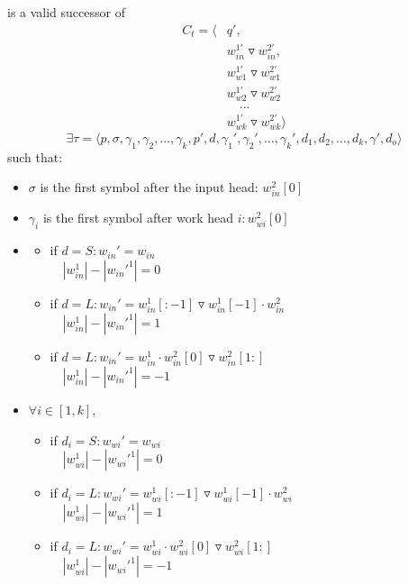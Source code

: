 \documentclass{article}
\newtheorem{definition}[theorem]{Definition}
\let\olddefinition\definition
\let\endolddefinition\enddefinition
\renewenvironment{definition}
  {\begin{tcolorbox}[
      colback=red!10,
      colframe=red!50!black,
      boxrule=0.6pt,
      arc=2pt,
      left=6pt,right=6pt,top=4pt,bottom=4pt,
      breakable
    ]\olddefinition}
  {\endolddefinition\end{tcolorbox}}
\begin{document}
\begin{definition}[Configuration]
    is a valid successor of 
    \begin{align*}
        C_{t} = \langle &q',\\
        & w_{in}^{1'}\triangledown w_{in}^{2'}, \\
        & w_{w1}^{1'}\triangledown w_{w1}^{2'} \\
        & w_{w2}^{1'}\triangledown w_{w2}^{2'} \\
        &\quad ...\\
        & w_{wk}^{1'}\triangledown w_{wk}^{2'} \rangle
    \end{align*}
    \[\exists \tau = \langle p, \sigma, \gamma_1, \gamma_2, \dots, \gamma_k, p', d, \gamma_1', \gamma_2', \dots, \gamma_k', d_1, d_2, \dots, d_k, \gamma', d_o\rangle\]
    such that: 
    \begin{itemize}
        \item $\sigma$ is the first symbol after the input head: $w_{in}^2[0]$
        \item $\gamma_i$ is the first symbol after work head $i: w_{wi}^2[0]$
        \item \begin{itemize}
            \item if $d = S: w_{in}' = w_{in}$\\
                    $\quad |w_{in}^1| - |w_{in}'^1| = 0$
            \item if $d = L: w_{in}' = w_{in}^1[:-1]\triangledown w_{in}^1[-1]\cdot w_{in}^2$\\   
                    $\quad |w_{in}^1| - |w_{in}'^1| = 1$
            \item if $d = L: w_{in}' = w_{in}^1\cdot w_{in}^2[0]\triangledown w_{in}^2[1:]$\\   
                    $\quad |w_{in}^1| - |w_{in}'^1| = -1$
        \end{itemize}
        \item $\forall i \in [1, k]$, \begin{itemize}
            \item if $d_i = S: w_{wi}' = w_{wi}$\\
                    $\quad |w_{wi}^1| - |w_{wi}'^1| = 0$
            \item if $d_i = L: w_{wi}' = w_{wi}^1[:-1]\triangledown w_{wi}^1[-1]\cdot w_{wi}^2$\\   
                    $\quad |w_{wi}^1| - |w_{wi}'^1| = 1$
            \item if $d_i = L: w_{wi}' = w_{wi}^1\cdot w_{wi}^2[0]\triangledown w_{wi}^2[1:]$\\   
                    $\quad |w_{wi}^1| - |w_{wi}'^1| = -1$
        \end{itemize}

    \end{itemize}
\end{definition}
\end{document}
